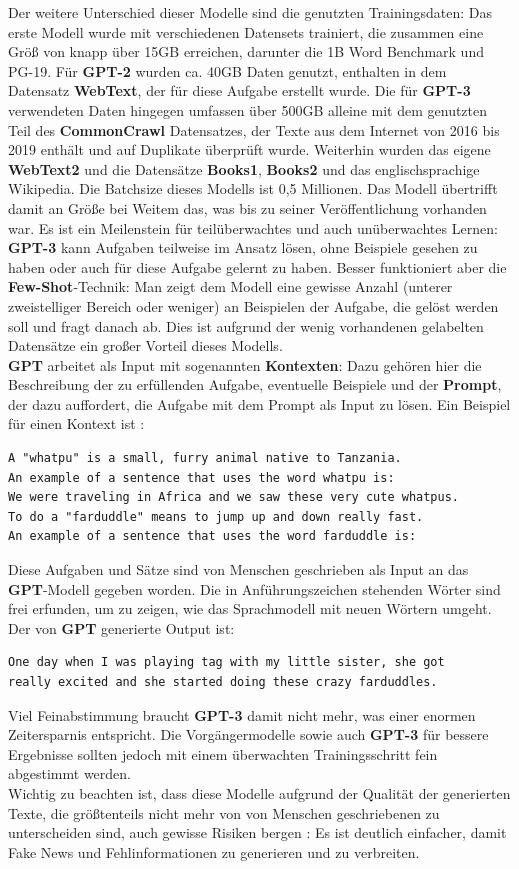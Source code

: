 Der weitere Unterschied dieser Modelle sind die genutzten Trainingsdaten: Das erste Modell wurde mit verschiedenen Datensets trainiert, die zusammen eine Gr\"o{\ss} von knapp \"uber 15GB erreichen, darunter die 1B Word Benchmark und PG-19. F\"ur \textbf{GPT-2} wurden ca. 40GB Daten genutzt, enthalten in dem Datensatz \textbf{WebText}, der f\"ur diese Aufgabe erstellt wurde. Die f\"ur \textbf{GPT-3} verwendeten Daten hingegen umfassen \"uber 500GB alleine mit dem genutzten Teil des \textbf{CommonCrawl} Datensatzes, der Texte aus dem Internet von 2016 bis 2019 enth\"alt und auf Duplikate \"uberpr\"uft wurde. Weiterhin wurden das eigene \textbf{WebText2} und die Datens\"atze \textbf{Books1}, \textbf{Books2} und das englischsprachige Wikipedia. Die Batchsize dieses Modells ist 0,5 Millionen. Das Modell \"ubertrifft damit an Gr\"o{\ss}e bei Weitem das, was bis zu seiner Ver\"offentlichung vorhanden war. Es ist ein Meilenstein f\"ur teil\"uberwachtes und auch un\"uberwachtes Lernen: \textbf{GPT-3} kann Aufgaben teilweise im Ansatz l\"osen, ohne Beispiele gesehen zu haben oder auch f\"ur diese Aufgabe gelernt zu haben. Besser funktioniert aber die \textbf{Few-Shot}-Technik: Man zeigt dem Modell eine gewisse Anzahl (unterer zweistelliger Bereich oder weniger) an Beispielen der Aufgabe, die gel\"ost werden soll und fragt danach ab. Dies ist aufgrund der wenig vorhandenen gelabelten Datens\"atze ein gro{\ss}er Vorteil dieses Modells.\\
\textbf{GPT} arbeitet als Input mit sogenannten \textbf{Kontexten}: Dazu geh\"oren hier die Beschreibung der zu erf\"ullenden Aufgabe, eventuelle Beispiele und der \textbf{Prompt}, der dazu auffordert, die Aufgabe mit dem Prompt als Input zu l\"osen. Ein Beispiel f\"ur einen Kontext ist \cite{gpt3}:
\begin{verbatim} 
A "whatpu" is a small, furry animal native to Tanzania. 
An example of a sentence that uses the word whatpu is:
We were traveling in Africa and we saw these very cute whatpus.
To do a "farduddle" means to jump up and down really fast. 
An example of a sentence that uses the word farduddle is:
\end{verbatim} 
Diese Aufgaben und S\"atze sind von Menschen geschrieben als Input an das \textbf{GPT}-Modell gegeben worden. Die in Anf\"uhrungszeichen stehenden W\"orter sind frei erfunden, um zu zeigen, wie das Sprachmodell mit neuen W\"ortern umgeht. Der von \textbf{GPT} generierte Output ist:
\begin{verbatim} 
One day when I was playing tag with my little sister, she got  
really excited and she started doing these crazy farduddles.
\end{verbatim} 
Viel Feinabstimmung braucht \textbf{GPT-3} damit nicht mehr, was einer enormen Zeitersparnis entspricht. Die Vorg\"angermodelle sowie auch \textbf{GPT-3} f\"ur bessere Ergebnisse sollten jedoch mit einem \"uberwachten Trainingsschritt fein abgestimmt werden.\\
Wichtig zu beachten ist, dass diese Modelle aufgrund der Qualit\"at der generierten Texte, die gr\"o{\ss}tenteils nicht mehr von von Menschen geschriebenen zu unterscheiden sind, auch gewisse Risiken bergen \cite{gpt3}: Es ist deutlich einfacher, damit Fake News und Fehlinformationen zu generieren und zu verbreiten.

